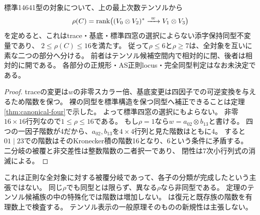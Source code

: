 \begin{proposition}[第三の二対二階数による全被覆分岐]\label{prop:opposite-rank-split}
標準14641型の対象について、上の最上次数テンソルから
\[
 \rho(C)=\rk\bigl((V_0\otimes V_2)^*\xrightarrow{\ w\ }V_1\otimes V_3\bigr)
\]
を定めると、これはtrace・基底・標準四窓の選択によらない添字保持同型不変量であり、
$2\leq\rho(C)\leq16$を満たす。
従って$\rho\leq6$と$\rho\geq7$は、全対象を互いに素な二つの部分へ分ける。
前者はテンソル候補空間内で相対的に閉、後者は相対的に開である。
各部分の正規形・AS正則locus・完全同型判定はなお未決定である。
\end{proposition}
\begin{proof}
traceの変更は$w$の非零スカラー倍、基底変更は四因子での可逆変換を与えるため階数を保つ。
裸の同型を標準構造を保つ同型へ補正できることは定理\ref{thm:canonical-four}で示した。
よって標準四窓の選択にもよらない。
非零$16\times16$行列なので$1\leq\rho\leq16$である。
もし$\rho=1$なら$w=a_{02}\otimes b_{13}$と書ける。
四つの一因子階数が4だから、$a_{02},b_{13}$を$4\times4$行列と見た階数はともに4。
すると$01\mid23$での階数はそのKronecker積の階数16となり、6という条件に矛盾する。
二分岐の被覆と非交差性は整数階数の二者択一であり、
閉性は7次小行列式の消滅による。
\end{proof}
\begin{remark}
これは正則な全対象に対する被覆分岐であって、各子の分類が完成したという主張ではない。
同じ$\rho$でも同型とは限らず、異なる$\rho$なら非同型である。
定理のテンソル候補族の中の特殊化では階数は増加しない。
は復元と既存族の階数を有理数上で検査する。
テンソル表示の一般原理そのものの新規性は主張しない。
\end{remark}

